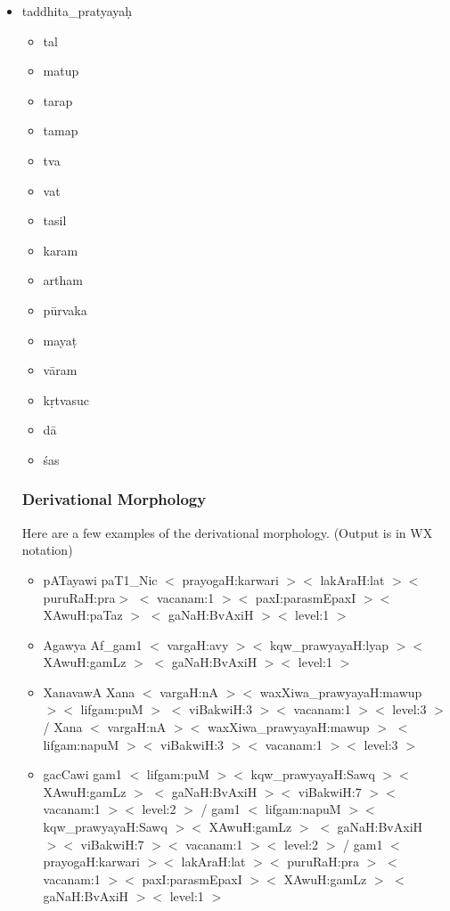 \documentclass{llncs}
\begin{document}
\begin{itemize}
\item taddhita\_pratyaya\d{h}
\begin{itemize}
\item tal
\item matup
\item tarap
\item tamap
\item tva
\item vat
\item tasil
\item karam
\item artham
\item p{\=u}rvaka
\item maya\d{t}
\item v{\=a}ram
\item k\d{r}tvasuc
\item d{\=a}
\item \'{s}as
\end{itemize}

\subsubsection{Derivational Morphology}
Here are a few examples of the derivational morphology. (Output is in WX notation)
\begin{itemize}
\item 
pATayawi	paT1\_Nic $<$ prayogaH:karwari $><$ lakAraH:lat $><$ puruRaH:pra$>$
		$<$ vacanam:1 $><$ paxI:parasmEpaxI $><$ XAwuH:paTaz $>$
		$<$ gaNaH:BvAxiH $><$ level:1 $>$

\item
Agawya   Af\_gam1 $<$ vargaH:avy $><$ kqw\_prawyayaH:lyap $><$ XAwuH:gamLz $>$
	 $<$ gaNaH:BvAxiH $><$ level:1 $>$

\item
XanavawA    Xana $<$ vargaH:nA $><$ waxXiwa\_prawyayaH:mawup $><$ lifgam:puM $>$
	    $<$ viBakwiH:3 $><$ vacanam:1 $><$ level:3 $>$ /
	    Xana $<$ vargaH:nA $><$ waxXiwa\_prawyayaH:mawup $>$ 
	    $<$ lifgam:napuM $><$ viBakwiH:3 $><$ vacanam:1 $><$ level:3 $>$

\item
gacCawi    gam1 $<$ lifgam:puM $><$ kqw\_prawyayaH:Sawq $><$ XAwuH:gamLz $>$ 
	   $<$ gaNaH:BvAxiH $><$ viBakwiH:7 $><$ vacanam:1 $><$ level:2 $>$ / 
	   gam1 $<$ lifgam:napuM $><$ kqw\_prawyayaH:Sawq $><$ XAwuH:gamLz $>$
	   $<$ gaNaH:BvAxiH $><$ viBakwiH:7 $><$ vacanam:1 $><$ level:2 $>$ / 
	   gam1 $<$ prayogaH:karwari $><$ lakAraH:lat $><$ puruRaH:pra $>$
	   $<$ vacanam:1 $><$ paxI:parasmEpaxI $><$ XAwuH:gamLz $>$ 
	   $<$ gaNaH:BvAxiH $><$ level:1 $>$

\end{itemize}
\end{itemize}
\end{document}
